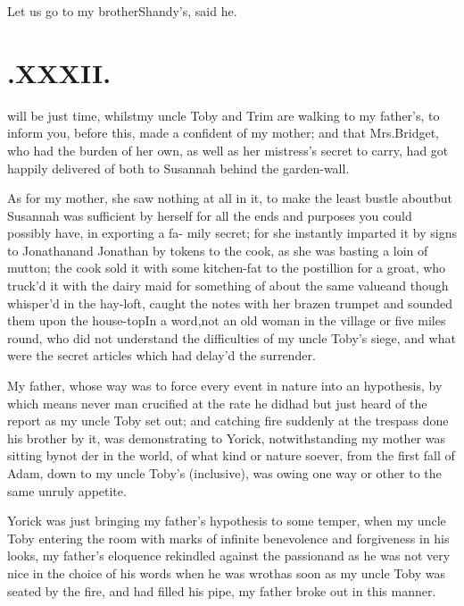 \documentclass{article}
\begin{document}
\tsh Let us go to my brother\break Shandy’s,
said he.

\vfill{}\eject
\null{}\baselineskip
\section{.\enspace XXXII.}

 will be just time, whilst\break my
uncle Toby and Trim are walking to my father’s,
to inform you,\break
{} before this,
made a confident of my mother; and that Mrs.\@ Bridget, who
had the burden of her own, as well as her mistress’s secret
to carry, had got happily delivered of both to Susannah
behind the garden-wall.

As for my mother, she saw nothing at all in it, to make the
least bustle about\break\tsh but Susannah was sufficient
by herself for all the ends and purposes you could possibly have,
in exporting a fa- mily secret; for she instantly imparted it by
signs to Jonathan\tsh and Jonathan by tokens
to the cook, as she was basting a loin of mutton; the cook sold it
with some kitchen-fat to the postillion for a groat, who
truck’d it with the dairy maid for something of about the
same value\tsh and though whisper’d in the hay-loft,
 caught the notes with her brazen trumpet and
sounded them upon the house-top\tsk In a word,\break not an old woman
in the village or five miles round, who did not understand the
difficulties of my uncle Toby’s siege, and what were
the secret articles which had delay’d the
surrender.\tsh

My father, whose way was to force every event in nature into an
hypothesis, by which means never man crucified 
at the rate he did\tsh had but just heard of the report as
my uncle Toby set out; and catching fire suddenly at
the trespass done his brother by it, was demonstrating to
Yorick, notwithstanding my mother was sitting
by\tsh not\break
{}
der in the world, of what kind or nature soever, from
the first fall of Adam, down to my uncle Toby’s
(inclusive), was owing one way or other to the same unruly
appetite.

Yorick was just bringing my father’s hypothesis to
some temper, when my uncle Toby entering the room with marks
of infinite benevolence and forgiveness in his looks, my
father’s eloquence re\-kindled against the
passion\tsh and as he was not very nice in the choice of
his words when he was wroth\tsh as soon as my uncle
Toby was seated by the fire, and had filled his pipe, my
father broke out in this manner.
\end{document}
